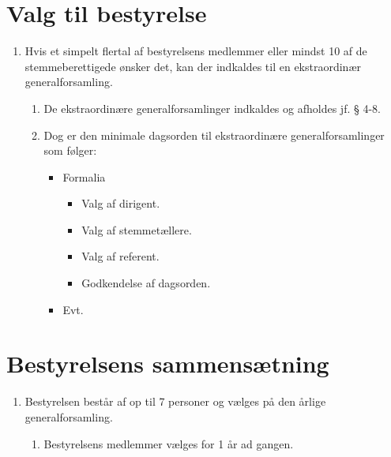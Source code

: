\documentclass[a4paper]{article}
\newenvironment{stykenum}{
  \begin{enumerate}[%
    label=Stk.~\arabic*., ref=\theenumi~Stk.~\arabic*, start=2]
}{\end{enumerate}}
\begin{document}
\section*{Valg til bestyrelse}

\begin{enumerate}[resume*=afsnit]

\item Hvis et simpelt flertal af bestyrelsens medlemmer eller mindst 10 af de
stemmeberettigede ønsker det, kan der indkaldes til en ekstraordinær
generalforsamling.

  \begin{stykenum}

  \item De ekstraordinære generalforsamlinger indkaldes og afholdes jf. § 4-8.

  \item Dog er den minimale dagsorden til ekstraordinære generalforsamlinger
        som følger:

        \begin{itemize}
        \item Formalia
          \begin{itemize}
          \item Valg af dirigent.
          \item Valg af stemmetællere.
          \item Valg af referent.
          \item Godkendelse af dagsorden.
          \end{itemize}
        \item Evt.
        \end{itemize}

  \end{stykenum}

\end{enumerate}


\section*{Bestyrelsens sammensætning}

\begin{enumerate}[resume*=afsnit]

\item Bestyrelsen består af op til 7 personer og vælges på den årlige
generalforsamling.

  \begin{stykenum}

  \item Bestyrelsens medlemmer vælges for 1 år ad gangen.

  \end{stykenum}

\end{enumerate}
\end{document}
